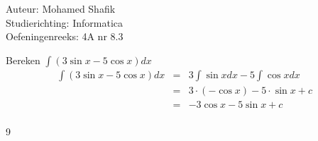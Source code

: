 \documentclass[a4paper]{article}
\begin{document}
\noindent \large Auteur: Mohamed Shafik \\
\noindent \large Studierichting: Informatica\\
\noindent \large Oefeningenreeks: 4A nr 8.3\\

\medskip

\normalsize

Bereken $\displaystyle\int (3 \sin x - 5 \cos x) dx$\\

\begin{eqnarray*}
\displaystyle\int (3 \sin x - 5 \cos x) dx &=& 3 \displaystyle\int \sin x dx - 5 \displaystyle\int \cos x dx\\
&=& 3 \cdot (-\cos x) - 5 \cdot \sin x + c\\
&=& -3 \cos x - 5 \sin x + c\\
\end{eqnarray*}

\begin{thebibliography}{9}
\end{thebibliography}
\end{document}
